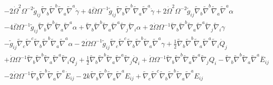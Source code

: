 \documentclass[10pt,letterpaper]{article}
\numberwithin{equation}{section}
\begin{document}
\begin{appendices}
\begin{eqnarray}
&& - 2 \dot{\Omega}^2 \Omega^{-2} \tilde{g}_{ij} \tilde{\nabla}_{b}\tilde{\nabla}^{b}\tilde{\nabla}_{a}\tilde{\nabla}^{a}\dot{\gamma} + 4 \overset{..}{\Omega} \Omega^{-1} \tilde{g}_{ij} \tilde{\nabla}_{b}\tilde{\nabla}^{b}\tilde{\nabla}_{a}\tilde{\nabla}^{a}\dot{\gamma} + 2 \dot{\Omega}^2 \Omega^{-2} \tilde{g}_{ij} \tilde{\nabla}_{b}\tilde{\nabla}^{b}\tilde{\nabla}_{a}\tilde{\nabla}^{a}\alpha \nonumber \\ 
&& - 4 \overset{..}{\Omega} \Omega^{-1} \tilde{g}_{ij} \tilde{\nabla}_{b}\tilde{\nabla}^{b}\tilde{\nabla}_{a}\tilde{\nabla}^{a}\alpha + \tilde{\nabla}_{b}\tilde{\nabla}^{b}\tilde{\nabla}_{a}\tilde{\nabla}^{a}\tilde{\nabla}_{j}\tilde{\nabla}_{i}\alpha + 2 \dot{\Omega} \Omega^{-1} \tilde{\nabla}_{b}\tilde{\nabla}^{b}\tilde{\nabla}_{a}\tilde{\nabla}^{a}\tilde{\nabla}_{j}\tilde{\nabla}_{i}\gamma \nonumber \\ 
&& -  \tilde{g}_{ij} \tilde{\nabla}_{c}\tilde{\nabla}^{c}\tilde{\nabla}_{b}\tilde{\nabla}^{b}\tilde{\nabla}_{a}\tilde{\nabla}^{a}\alpha - 2 \dot{\Omega} \Omega^{-1} \tilde{g}_{ij} \tilde{\nabla}_{c}\tilde{\nabla}^{c}\tilde{\nabla}_{b}\tilde{\nabla}^{b}\tilde{\nabla}_{a}\tilde{\nabla}^{a}\gamma +\tfrac{1}{2} \tilde{\nabla}_{b}\tilde{\nabla}^{b}\tilde{\nabla}_{a}\tilde{\nabla}^{a}\tilde{\nabla}_{i}\dot{Q}_{j} \nonumber \\ 
&& + \dot{\Omega} \Omega^{-1} \tilde{\nabla}_{b}\tilde{\nabla}^{b}\tilde{\nabla}_{a}\tilde{\nabla}^{a}\tilde{\nabla}_{i}Q_{j} + \tfrac{1}{2} \tilde{\nabla}_{b}\tilde{\nabla}^{b}\tilde{\nabla}_{a}\tilde{\nabla}^{a}\tilde{\nabla}_{j}\dot{Q}_{i} + \dot{\Omega} \Omega^{-1} \tilde{\nabla}_{b}\tilde{\nabla}^{b}\tilde{\nabla}_{a}\tilde{\nabla}^{a}\tilde{\nabla}_{j}Q_{i}- \tilde{\nabla}_{b}\tilde{\nabla}^{b}\tilde{\nabla}_{a}\tilde{\nabla}^{a}\overset{..}{E}_{ij} \nonumber \\ 
&& - 2 \dot{\Omega} \Omega^{-1} \tilde{\nabla}_{b}\tilde{\nabla}^{b}\tilde{\nabla}_{a}\tilde{\nabla}^{a}\dot{E}_{ij} - 2 k \tilde{\nabla}_{b}\tilde{\nabla}^{b}\tilde{\nabla}_{a}\tilde{\nabla}^{a}E_{ij} + \tilde{\nabla}_{c}\tilde{\nabla}^{c}\tilde{\nabla}_{b}\tilde{\nabla}^{b}\tilde{\nabla}_{a}\tilde{\nabla}^{a}E_{ij}
\end{eqnarray}



\end{appendices}
\end{document}
